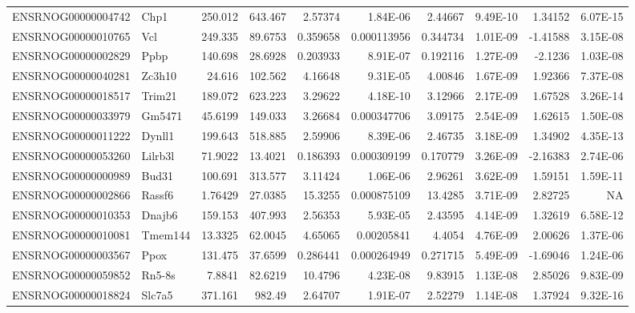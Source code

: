 \begin{sidewaystable}[]
\begin{tabular}{llrrrrrrrr}
ENSRNOG00000004742 & Chp1     & 250.012      & 643.467      & 2.57374  & 1.84E-06    & 2.44667     & 9.49E-10    & 1.34152      & 6.07E-15    \\
ENSRNOG00000010765 & Vcl      & 249.335      & 89.6753      & 0.359658 & 0.000113956 & 0.344734    & 1.01E-09    & -1.41588     & 3.15E-08    \\
ENSRNOG00000002829 & Ppbp     & 140.698      & 28.6928      & 0.203933 & 8.91E-07    & 0.192116    & 1.27E-09    & -2.1236      & 1.03E-08    \\
ENSRNOG00000040281 & Zc3h10   & 24.616       & 102.562      & 4.16648  & 9.31E-05    & 4.00846     & 1.67E-09    & 1.92366      & 7.37E-08    \\
ENSRNOG00000018517 & Trim21   & 189.072      & 623.223      & 3.29622  & 4.18E-10    & 3.12966     & 2.17E-09    & 1.67528      & 3.26E-14    \\
ENSRNOG00000033979 & Gm5471   & 45.6199      & 149.033      & 3.26684  & 0.000347706 & 3.09175     & 2.54E-09    & 1.62615      & 1.50E-08    \\
ENSRNOG00000011222 & Dynll1   & 199.643      & 518.885      & 2.59906  & 8.39E-06    & 2.46735     & 3.18E-09    & 1.34902      & 4.35E-13    \\
ENSRNOG00000053260 & Lilrb3l  & 71.9022      & 13.4021      & 0.186393 & 0.000309199 & 0.170779    & 3.26E-09    & -2.16383     & 2.74E-06    \\
ENSRNOG00000000989 & Bud31    & 100.691      & 313.577      & 3.11424  & 1.06E-06    & 2.96261     & 3.62E-09    & 1.59151      & 1.59E-11    \\
ENSRNOG00000002866 & Rassf6   & 1.76429      & 27.0385      & 15.3255  & 0.000875109 & 13.4285     & 3.71E-09    & 2.82725      & NA          \\
ENSRNOG00000010353 & Dnajb6   & 159.153      & 407.993      & 2.56353  & 5.93E-05    & 2.43595     & 4.14E-09    & 1.32619      & 6.58E-12    \\
ENSRNOG00000010081 & Tmem144  & 13.3325      & 62.0045      & 4.65065  & 0.00205841  & 4.4054      & 4.76E-09    & 2.00626      & 1.37E-06    \\
ENSRNOG00000003567 & Ppox     & 131.475      & 37.6599      & 0.286441 & 0.000264949 & 0.271715    & 5.49E-09    & -1.69046     & 1.24E-06    \\
ENSRNOG00000059852 & Rn5-8s   & 7.8841       & 82.6219      & 10.4796  & 4.23E-08    & 9.83915     & 1.13E-08    & 2.85026      & 9.83E-09    \\
ENSRNOG00000018824 & Slc7a5   & 371.161      & 982.49       & 2.64707  & 1.91E-07    & 2.52279     & 1.14E-08    & 1.37924      & 9.32E-16    \\

\end{tabular}
\end{sidewaystable}
